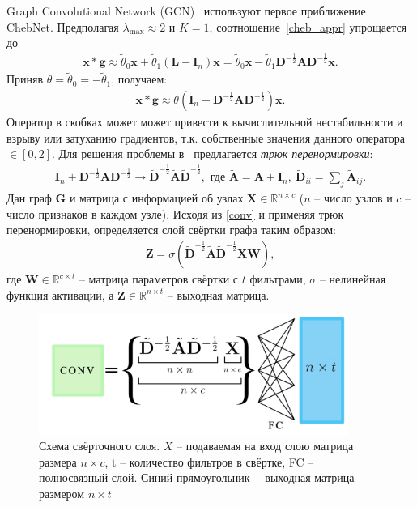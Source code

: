 \documentclass[14pt]{extarticle}
\begin{document}
Graph Convolutional Network (GCN)~\cite{kipf_semi-supervised_2017} используют первое приближение ChebNet. Предполагая $\lambda_{\max} \approx 2$ и $K=1$, соотношение~\eqref{cheb_appr} упрощается до 
\begin{align}
\mathbf{x} * \mathbf{g} \approx \tilde{\theta}_{0} \mathbf{x}+\tilde{\theta}_{1}\left(\mathbf{L}-\mathbf{I}_{n}\right) \mathbf{x}=\tilde{\theta}_{0} \mathbf{x}-\tilde{\theta}_{1} \mathbf{D}^{-\frac{1}{2}} \mathbf{A} \mathbf{D}^{-\frac{1}{2}} \mathbf{x}.
\end{align}
Приняв $\theta = \tilde{\theta}_0  = -\tilde{\theta}_1$, получаем:
\begin{align}
\mathbf{x} * \mathbf{g}  \approx \theta\left(\mathbf{I}_{n}+\mathbf{D}^{-\frac{1}{2}} \mathbf{A} \mathbf{D}^{-\frac{1}{2}}\right) \mathbf{x}.
\label{conv}
\end{align}
Оператор в скобках может может привести к вычислительной нестабильности и взрыву или затуханию градиентов, т.к. собственные значения данного оператора $\in [0,2]$. Для решения проблемы в~\cite{kipf_semi-supervised_2017} предлагается \textit{трюк перенормировки}: 
\begin{align*}
\mathbf{I}_{n}+\mathbf{D}^{-\frac{1}{2}} \mathbf{A} \mathbf{D}^{-\frac{1}{2}} \rightarrow
\tilde{\mathbf{D}}^{-\frac{1}{2}} \tilde{\mathbf{A}}\tilde{\mathbf{D}}^{-\frac{1}{2}}, 
\text{ где }
\tilde{\mathbf{A}}=\mathbf{A}+\mathbf{I}_{n},~ \tilde{\mathbf{D}}_{i i}=\sum_{j} \tilde{\mathbf{A}}_{i j}.
\end{align*}
Дан граф $\mathbf{G}$ и матрица с информацией об узлах $\mathbf{X} \in \mathbb{R}^{n \times c}$ ($n$ -- число узлов и $c$ -- число признаков в каждом узле). Исходя из \eqref{conv} и применяя трюк перенормировки, определяется слой свёртки графа таким образом:
\begin{align}
\mathbf{Z}=\sigma\left(\tilde{\mathbf{D}}^{-\frac{1}{2}} \tilde{\mathbf{A}}\tilde{\mathbf{D}}^{-\frac{1}{2}} \mathbf{X} \mathbf{W}\right),
\label{Z_conv}
\end{align}
где $\mathbf{W} \in \mathbb{R}^{c \times t}$ – матрица параметров свёртки с $t$ фильтрами, $\sigma$ – нелинейная функция активации, а $\mathbf{Z} \in \mathbb{R}^{n \times t}$ -- выходная матрица.
\begin{figure}[h]
	\centering
	\includegraphics[width=0.9\textwidth]{conv_layer.pdf}
	\caption{Схема свёрточного слоя. $X$ -- подаваемая на вход слою матрица размера $n\times c$, $\text{t}$ -- количество фильтров в свёртке, FC -- полносвязный слой. Синий прямоугольник~-- выходная матрица размером $n\times t$}
	\label{fig:convlayer}
\end{figure}
\end{document}
